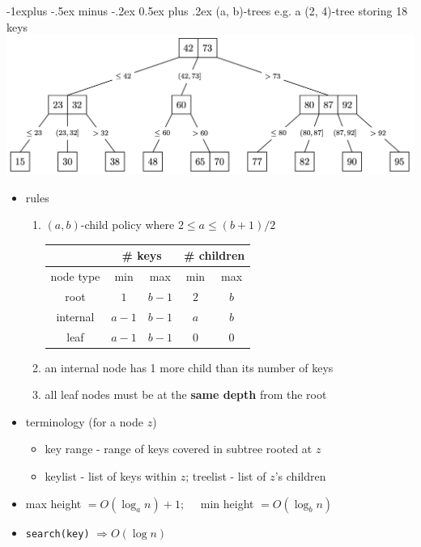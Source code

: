 \documentclass[10pt]{article}
\makeatletter
\renewcommand{\subsection}{\@startsection{subsection}{2}{0mm}%
                                {-1explus -.5ex minus -.2ex}%
                                {0.5ex plus .2ex}%
                                {\normalfont\normalsize\bfseries}}
\let\Then\Rightarrow
\newcommand{\code}[1]{\textcolor{mygreen}{\texttt{#1}}}
\makeatother
\begin{document}
\begin{multicols}{3}
\subsection{(a, b)-trees}
{\scriptsize{e.g. a (2, 4)-tree storing 18 keys}}
\includegraphics[width=0.8\linewidth]{cs2040s-ab-tree.png}
\begin{itemize}
    \item rules
    \begin{enumerate}
        \item $(a, b)$-child policy where $2 \leq a \leq (b+1)/2$
        \begin{tabular}{|c|c|c|c|c|}
            \hline 
             & \multicolumn{2}{c|}{\# keys} & \multicolumn{2}{c|}{\# children}
            \\\hline
            node type & min & max & min & max
            \\\hline
            root & $1$ & $b-1$ & $2$ & $b$
            \\\hline
            internal & $a-1$ & $b-1$ & $a$ & $b$
            \\\hline
            leaf & $a-1$ & $b-1$ & $0$ & $0$
            \\\hline
        \end{tabular}
        \item an internal node has 1 more child than its number of keys
        \item all leaf nodes must be at the \textbf{same depth} from the root
    \end{enumerate}
    \item terminology (for a node $z$)
    \begin{itemize}
        \item key range - range of keys covered in subtree rooted at $z$
        \item keylist - list of keys within $z$; treelist - list of $z$'s children
    \end{itemize}
    \item max height $= O(\log_an) + 1;\quad$ min height $= O(\log_bn)$
    \item \code{search(key)} $\Then O(\log n)$

\end{itemize}
\end{multicols}
\end{document}
